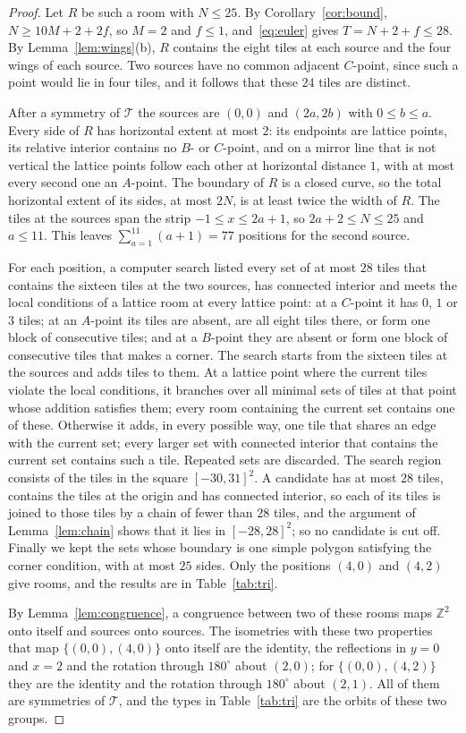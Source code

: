 \documentclass[11pt,a4paper]{article}
\theoremstyle{plain}
\theoremstyle{definition}
\theoremstyle{remark}
\newcommand{\Z}{\mathbb{Z}}
\newcommand{\T}{\mathcal{T}}
\newcommand{\dg}{^\circ}
\numberwithin{equation}{section}
\begin{document}
\begin{proof}
Let $R$ be such a room with $N\le25$. By Corollary~\ref{cor:bound}, $N\ge10M+2+2f$, so $M=2$ and $f\le1$, and~\eqref{eq:euler} gives $T=N+2+f\le28$. By Lemma~\ref{lem:wings}(b), $R$ contains the eight tiles at each source and the four wings of each source. Two sources have no common adjacent $C$-point, since such a point would lie in four tiles, and it follows that these $24$ tiles are distinct.

After a symmetry of $\T$ the sources are $(0,0)$ and $(2a,2b)$ with $0\le b\le a$. Every side of $R$ has horizontal extent at most $2$: its endpoints are lattice points, its relative interior contains no $B$- or $C$-point, and on a mirror line that is not vertical the lattice points follow each other at horizontal distance $1$, with at most every second one an $A$-point. The boundary of $R$ is a closed curve, so the total horizontal extent of its sides, at most $2N$, is at least twice the width of $R$. The tiles at the sources span the strip $-1\le x\le2a+1$, so $2a+2\le N\le25$ and $a\le11$. This leaves $\sum_{a=1}^{11}(a+1)=77$ positions for the second source.

For each position, a computer search listed every set of at most $28$ tiles that contains the sixteen tiles at the two sources, has connected interior and meets the local conditions of a lattice room at every lattice point: at a $C$-point it has $0$, $1$ or $3$ tiles; at an $A$-point its tiles are absent, are all eight tiles there, or form one block of consecutive tiles; and at a $B$-point they are absent or form one block of consecutive tiles that makes a corner. The search starts from the sixteen tiles at the sources and adds tiles to them. At a lattice point where the current tiles violate the local conditions, it branches over all minimal sets of tiles at that point whose addition satisfies them; every room containing the current set contains one of these. Otherwise it adds, in every possible way, one tile that shares an edge with the current set; every larger set with connected interior that contains the current set contains such a tile. Repeated sets are discarded. The search region consists of the tiles in the square $[-30,31]^2$. A candidate has at most $28$ tiles, contains the tiles at the origin and has connected interior, so each of its tiles is joined to those tiles by a chain of fewer than $28$ tiles, and the argument of Lemma~\ref{lem:chain} shows that it lies in $[-28,28]^2$; so no candidate is cut off. Finally we kept the sets whose boundary is one simple polygon satisfying the corner condition, with at most $25$ sides. Only the positions $(4,0)$ and $(4,2)$ give rooms, and the results are in Table~\ref{tab:tri}.

By Lemma~\ref{lem:congruence}, a congruence between two of these rooms maps $\Z^2$ onto itself and sources onto sources. The isometries with these two properties that map $\{(0,0),(4,0)\}$ onto itself are the identity, the reflections in $y=0$ and $x=2$ and the rotation through $180\dg$ about $(2,0)$; for $\{(0,0),(4,2)\}$ they are the identity and the rotation through $180\dg$ about $(2,1)$. All of them are symmetries of $\T$, and the types in Table~\ref{tab:tri} are the orbits of these two groups.
\end{proof}
\end{document}
